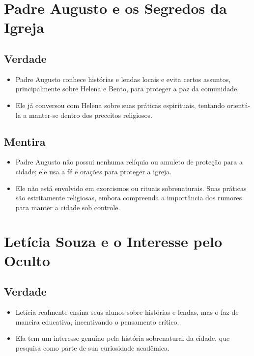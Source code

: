\section{Padre Augusto e os Segredos da Igreja}

\subsection*{Verdade}
\begin{itemize}
    \item Padre Augusto conhece histórias e lendas locais e evita certos assuntos, principalmente sobre Helena e Bento, para proteger a paz da comunidade.
    \item Ele já conversou com Helena sobre suas práticas espirituais, tentando orientá-la a manter-se dentro dos preceitos religiosos.
\end{itemize}

\subsection*{Mentira}
\begin{itemize}
    \item Padre Augusto não possui nenhuma relíquia ou amuleto de proteção para a cidade; ele usa a fé e orações para proteger a igreja.
    \item Ele não está envolvido em exorcismos ou rituais sobrenaturais. Suas práticas são estritamente religiosas, embora compreenda a importância dos rumores para manter a cidade sob controle.
\end{itemize}

\section{Letícia Souza e o Interesse pelo Oculto}

\subsection*{Verdade}
\begin{itemize}
    \item Letícia realmente ensina seus alunos sobre histórias e lendas, mas o faz de maneira educativa, incentivando o pensamento crítico.
    \item Ela tem um interesse genuíno pela história sobrenatural da cidade, que pesquisa como parte de sua curiosidade acadêmica.
\end{itemize}

